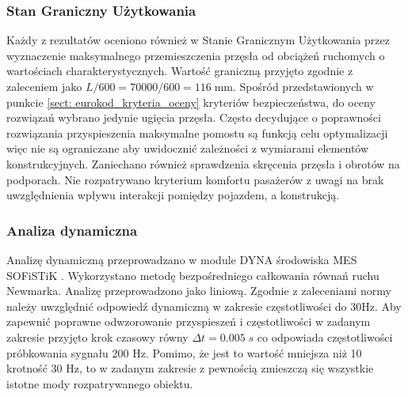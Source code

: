 \subsubsection{Stan Graniczny Użytkowania}
Każdy z rezultatów oceniono również w Stanie Granicznym Użytkowania przez wyznaczenie maksymalnego przemieszczenia przęsła od obciążeń ruchomych o wartościach charakterystycznych. Wartość graniczną przyjęto zgodnie z zaleceniem \cite{PKNc} jako $L/600=70000/600=116\;\text{mm}$. Spośród przedstawionych w punkcie \ref{sect: eurokod_kryteria_oceny} kryteriów bezpieczeństwa, do oceny rozwiązań wybrano jedynie ugięcia przęsła. Często decydujące o poprawności rozwiązania przyspieszenia maksymalne pomostu są funkcją celu optymalizacji więc nie są ograniczane aby uwidocznić zależności z wymiarami elementów konstrukcyjnych. Zaniechano również sprawdzenia skręcenia przęsła i obrotów na podporach. Nie rozpatrywano kryterium komfortu pasażerów z uwagi na brak uwzględnienia wpływu interakcji pomiędzy pojazdem, a konstrukcją.

\subsubsection{Analiza dynamiczna}
Analizę dynamiczną przeprowadzano w module DYNA środowiska MES SOFiSTiK \cite{SOFiSTiK2018a}. Wykorzystano metodę bezpośredniego całkowania równań ruchu Newmarka. Analizę przeprowadzono jako liniową. Zgodnie z zaleceniami normy \cite{PKNc} należy uwzględnić odpowiedź dynamiczną w zakresie częstotliwości do 30Hz. Aby zapewnić poprawne odwzorowanie przyspieszeń i częstotliwości w zadanym zakresie przyjęto krok czasowy równy $\Delta t = 0.005\;s$ co odpowiada częstotliwości próbkowania sygnału 200 Hz. Pomimo, że jest to wartość mniejsza niż 10 krotność 30 Hz, to w zadanym zakresie z pewnością zmieszczą się wszystkie istotne mody rozpatrywanego obiektu.

